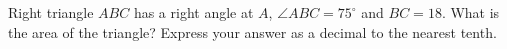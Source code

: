 Right triangle $ABC$ has a right angle at $A$, $\angle ABC=75^\circ$ and $BC=18$. What is the area of the triangle? Express your answer as a decimal to the nearest tenth.
